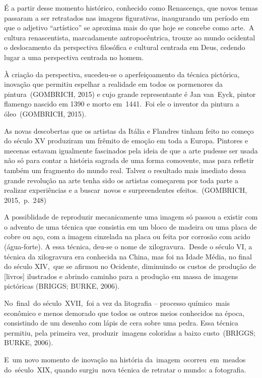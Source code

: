 \documentclass[
  letterpaper,
  a4paper,
  12pt]{scrbook}
\renewenvironment{quote}
  {\par\singlespacing\small\list{}{\rightmargin=0cm \leftmargin=4cm}%
   \item\relax}
  {\endlist}
\begin{document}
É a partir desse momento histórico, conhecido como Renascença, que novos
temas passaram a ser retratados nas imagens figurativas, inaugurando um
período em que o adjetivo ``artístico'' se aproxima mais do que hoje se
concebe como arte.~A cultura renascentista, marcadamente
antropocêntrica, trouxe ao mundo ocidental o deslocamento da perspectiva
filosófica e cultural centrada em Deus, cedendo lugar a uma perspectiva
centrada no homem.~

À criação da perspectiva, sucedeu-se o aperfeiçoamento da técnica
pictórica, inovação que permitiu espelhar a realidade em todos os
pormenores da pintura~(GOMBRICH, 2015) e cujo grande representante é Jan
van~Eyck, pintor flamengo nascido em 1390 e morto em~1441.~Foi ele o
inventor da pintura a óleo~(GOMBRICH, 2015).~ ~

\begin{quote}
As novas descobertas que os artistas da Itália e Flandres tinham feito
no começo do século XV produziram um frêmito de emoção em toda a Europa.
Pintores e mecenas estavam igualmente fascinados pela ideia de que a
arte pudesse ser usada não só para contar a história sagrada de uma
forma comovente, mas para refletir também um fragmento do mundo real.
Talvez o resultado mais imediato dessa grande revolução na arte tenha
sido os artistas começarem por toda parte a realizar experiências e a
buscar~novos e surpreendentes efeitos.~(GOMBRICH, 2015,~p.~248)~ ~
\end{quote}

A possiblidade de reproduzir mecanicamente uma imagem só passou a
existir com o advento de uma técnica que consistia em um bloco de
madeira ou uma placa de cobre ou aço, com a imagem cinzelada na placa ou
feita por corrosão com acido (água-forte). A essa técnica, deu-se o nome
de xilogravura.~Desde o século VI, a técnica da xilogravura era
conhecida na China, mas foi na Idade Média, no final do século XIV,~que
se afirmou no Ocidente, diminuindo os custos de produção de {[}livros{]}
ilustrados e abrindo caminho para a produção em massa de imagens
pictóricas (BRIGGS; BURKE, 2006).

No~final~do século~XVII,~foi a vez da litografia -- processo
químico~mais econômico e menos demorado que todos os outros meios
conhecidos na época, consistindo de um desenho com lápis de cera sobre
uma pedra. Essa técnica permitiu, pela primeira vez, produzir~imagens
coloridas a baixo custo~(BRIGGS; BURKE, 2006).~

E~um novo momento de inovação na história da~imagem~ocorreu~em~meados
do~século~XIX, quando surgiu~nova técnica de retratar o mundo: a
fotografia.~
\end{document}
